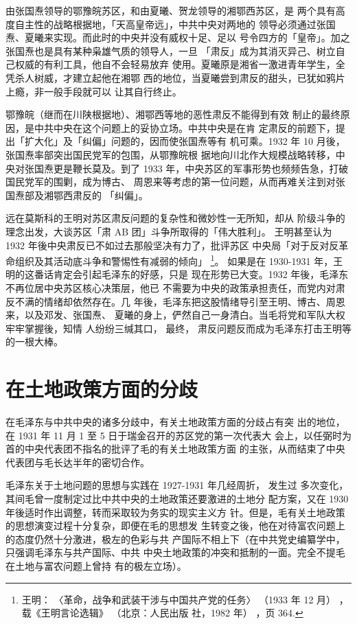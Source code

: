 由张国焘领导的鄂豫皖苏区，和由夏曦、贺龙领导的湘鄂西苏区，是
两个具有高度自主性的战略根据地，「天高皇帝远」，中共中央对两地的
领导必须通过张国焘、夏曦来实现。而此时的中央并没有威权十足、足以
号令四方的「皇帝」。加之张国焘也是具有某种枭雄气质的领导人，一旦
「肃反」成为其消灭异己、树立自己权威的有利工具，他自不会轻易放弃
使用。夏曦原是湘省一激进青年学生，全凭杀人树威，才建立起他在湘鄂
西的地位，当夏曦尝到肃反的甜头，已犹如鸦片上瘾，非一般手段就可以
让其自行终止。

 
鄂豫皖（继而在川陕根据地）、湘鄂西等地的恶性肃反不能得到有效
制止的最终原因，是中共中央在这个问题上的妥协立场。中共中央是在肯
定肃反的前题下，提出「扩大化」及「纠偏」问题的，因而使张国焘等有
机可乘。1932 年 10 月後，张国焘率部突出国民党军的包围，从鄂豫皖根
据地向川北作大规模战略转移，中央对张国焘更是鞭长莫及。到了 1933
年，中央苏区的军事形势也频频告急，打破国民党军的围剿，成为博古、
周恩来等考虑的第一位问题，从而再难关注到对张国焘部及湘鄂西肃反的
「纠偏」。

远在莫斯科的王明对苏区肃反问题的复杂性和微妙性一无所知，却从
阶级斗争的理念出发，大谈苏区「肃 AB 团」斗争所取得的「伟大胜利」。
王明甚至认为 1932 年後中央肃反已不如过去那般坚决有力了，批评苏区
中央局「对于反对反革命组织及其活动底斗争和警惕性有减弱的倾向」
\footnote{ 王明：
〈革命，战争和武装干涉与中国共产党的任务〉
（1933 年 12 月）
，载《王明言论选辑》
（北京：人民出版
社，1982 年）
，页 364.}。
如果是在 1930-1931 年，王明的这番话肯定会引起毛泽东的好感，只是
现在形势已大变。1932 年後，毛泽东不再位居中央苏区核心决策层，他已
不需要为中央的政策承担责任，而党内对肃反不满的情绪却依然存在。几
年後，毛泽东把这股情绪导引至王明、博古、周恩来，以及邓发、张国焘、
夏曦的身上，俨然自己一身清白。当毛将党和军队大权牢牢掌握後，知情
人纷纷三缄其口，
最终，
肃反问题反而成为毛泽东打击王明等的一根大棒。

\section{在土地政策方面的分歧}
在毛泽东与中共中央的诸多分歧中，有关土地政策方面的分歧占有突
出的地位，在 1931 年 11 月 1 至 5 日于瑞金召开的苏区党的第一次代表大
会上，以任弼时为首的中央代表团不指名的批评了毛的有关土地政策方面
的主张，从而结束了中央代表团与毛长达半年的密切合作。

毛泽东关于土地问题的思想与实践在 1927-1931 年几经周折，
发生过
多次变化，其间毛曾一度制定过比中共中央的土地政策还要激进的土地分
配方案，又在 1930 年後适时作出调整，转而采取较为务实的现实主义方
针。但是，毛有关土地政策的思想演变过程十分复杂，即便在毛的思想发
生转变之後，他在对待富农问题上的态度仍然十分激进，极左的色彩与共
产国际不相上下（在中共党史编纂学中，只强调毛泽东与共产国际、中共
中央土地政策的冲突和抵制的一面。完全不提毛在土地与富农问题上曾持
有的极左立场）。
 
